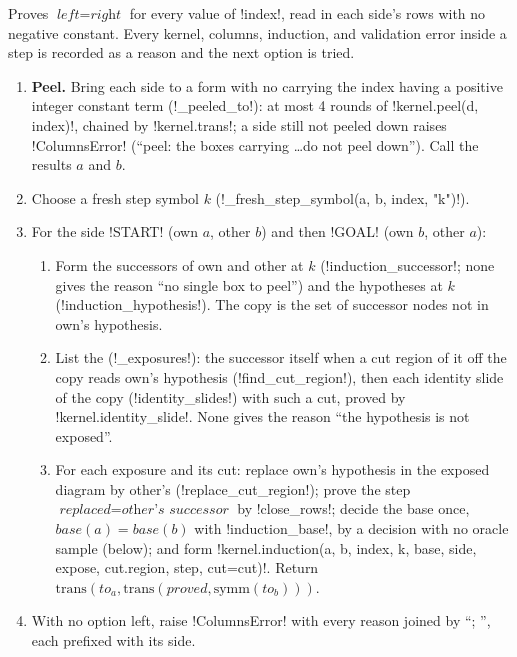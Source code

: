 \begin{algorithm}\label{alg:semantics-induct-rows}
Proves $\textit{left}=\textit{right}$ for every value of \py!index!, read in each side's rows \bbox{} with no negative constant. Every kernel, columns, induction, \bbox{} and validation error inside a step is recorded as a reason and the next option is tried.
\begin{enumerate}
\item \textbf{Peel.} Bring each side to a form with no \bbox{} carrying the index having a positive integer constant term (\py!_peeled_to!): at most 4 rounds of \py!kernel.peel(d, index)!, chained by \py!kernel.trans!; a side still not peeled down raises \py!ColumnsError! (``peel: the boxes carrying \ldots do not peel down''). Call the results $a$ and $b$.
\item Choose a fresh step symbol $k$ (\py!_fresh_step_symbol(a, b, index, "k")!).
\item For the side \code!START! (own $a$, other $b$) and then \code!GOAL! (own $b$, other $a$):
  \begin{enumerate}
  \item Form the successors of own and other at $k$ (\py!induction_successor!; none gives the reason ``no single box to peel'') and the hypotheses at $k$ (\py!induction_hypothesis!). The copy is the set of successor nodes not in own's hypothesis.
  \item List the  (\py!_exposures!): the successor itself when a cut region of it off the copy reads own's hypothesis (\py!find_cut_region!), then each identity slide of the copy (\py!identity_slides!) with such a cut, proved by \py!kernel.identity_slide!. None gives the reason ``the hypothesis is not exposed''.
  \item For each exposure and its cut: replace own's hypothesis in the exposed diagram by other's (\py!replace_cut_region!); prove the step $\textit{replaced}=\textit{other's successor}$ by \py!close_rows!; decide the base once, $\textit{base}(a)=\textit{base}(b)$ with \py!induction_base!, by a decision with no oracle sample (below); and form \py!kernel.induction(a, b, index, k, base, side, expose, cut.region, step, cut=cut)!. Return $\mathrm{trans}(\textit{to}_a,\mathrm{trans}(\textit{proved},\mathrm{symm}(\textit{to}_b)))$.
  \end{enumerate}
\item With no option left, raise \py!ColumnsError! with every reason joined by ``; '', each prefixed with its side.
\end{enumerate}
\end{algorithm}

